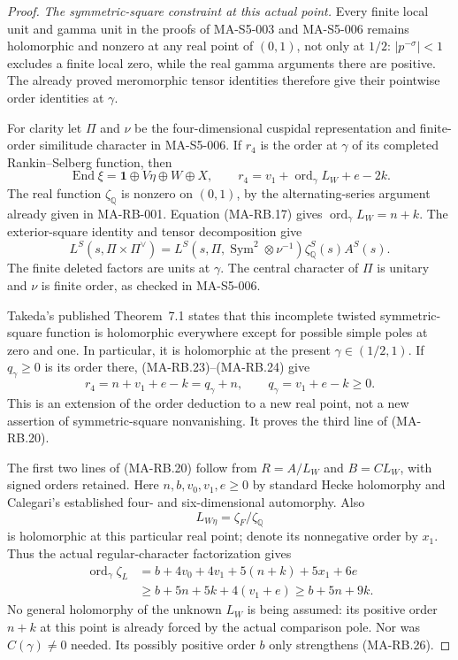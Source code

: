 \begin{proof}
\emph{The symmetric-square constraint at this actual point.}
Every finite local unit and gamma unit in the proofs of
MA-S5-003 and MA-S5-006 remains holomorphic and nonzero
at any real point of \((0,1)\), not only at \(1/2\):
\(|p^{-\sigma}|<1\) excludes a finite local zero, while
the real gamma arguments there are positive.
The already proved meromorphic tensor identities therefore
give their pointwise order identities at \(\gamma\).

For clarity let \(\Pi\) and \(\nu\) be the four-dimensional
cuspidal representation and finite-order similitude
character in MA-S5-006.  If \(r_4\) is the order at \(\gamma\)
of its completed Rankin--Selberg function, then
\[
 \operatorname{End}\xi=\mathbf1\oplus V\eta\oplus W\oplus X,
 \qquad
 r_4=v_1+\operatorname{ord}_\gamma L_W+e-2k .
 \tag{MA-RB.23}
\]
The real function \(\zeta_{\mathbb Q}\) is nonzero on
\((0,1)\), by the alternating-series argument already
given in MA-RB-001.
Equation (MA-RB.17) gives
\(\operatorname{ord}_\gamma L_W=n+k\).
The exterior-square identity and tensor decomposition give
\[
 L^S(s,\Pi\times\Pi^\vee)
  =L^S(s,\Pi,\operatorname{Sym}^2\otimes\nu^{-1})
                               \zeta_{\mathbb Q}^S(s)A^S(s).
 \tag{MA-RB.24}
\]
The finite deleted factors are units at \(\gamma\).
The central character of \(\Pi\) is unitary and
\(\nu\) is finite order, as checked in MA-S5-006.

Takeda's published Theorem~7.1 states that this incomplete
twisted symmetric-square function is holomorphic everywhere
except for possible simple poles at zero and one.
In particular, it is holomorphic at the present
\(\gamma\in(1/2,1)\).
If \(q_\gamma\ge0\) is its order there, (MA-RB.23)--(MA-RB.24)
give
\[
       r_4=n+v_1+e-k=q_\gamma+n,\qquad
                         q_\gamma=v_1+e-k\ge0.
 \tag{MA-RB.25}
\]
This is an extension of the order deduction to a new real
point, not a new assertion of symmetric-square nonvanishing.
It proves the third line of (MA-RB.20).

The first two lines of (MA-RB.20) follow from \(R=A/L_W\)
and \(B=C L_W\), with signed orders retained.
Here \(n,b,v_0,v_1,e\ge0\) by standard Hecke holomorphy
and Calegari's established four- and six-dimensional
automorphy.  Also
\[
 L_{W\eta}=\zeta_F/\zeta_{\mathbb Q}
\]
is holomorphic at this particular real point; denote its
nonnegative order by \(x_1\).
Thus the actual regular-character factorization gives
\[
 \begin{aligned}
 \operatorname{ord}_\gamma\zeta_L
    &=b+4v_0+4v_1+5(n+k)+5x_1+6e\\
    &\ge b+5n+5k+4(v_1+e)
     \ge b+5n+9k .
 \end{aligned}
 \tag{MA-RB.26}
\]
No general holomorphy of the unknown \(L_W\) is being
assumed: its positive order \(n+k\) at this point is
already forced by the actual comparison pole.
Nor was \(C(\gamma)\ne0\) needed.  Its possibly positive
order \(b\) only strengthens (MA-RB.26).


\end{proof}
